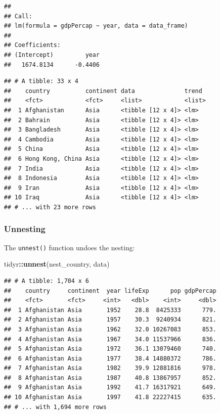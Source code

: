 \documentclass[12pt,]{article}
\newenvironment{Shaded}{\begin{snugshade}}{\end{snugshade}}
\newcommand{\KeywordTok}[1]{\textcolor[rgb]{0.13,0.29,0.53}{\textbf{#1}}}
\newcommand{\StringTok}[1]{\textcolor[rgb]{0.31,0.60,0.02}{#1}}
\newcommand{\CommentTok}[1]{\textcolor[rgb]{0.56,0.35,0.01}{\textit{#1}}}
\newcommand{\OperatorTok}[1]{\textcolor[rgb]{0.81,0.36,0.00}{\textbf{#1}}}
\newcommand{\NormalTok}[1]{#1}
\begin{document}
\begin{verbatim}
## 
## Call:
## lm(formula = gdpPercap ~ year, data = data_frame)
## 
## Coefficients:
## (Intercept)         year  
##   1674.8134      -0.4406
\end{verbatim}

\begin{Shaded}
\end{Shaded}

\begin{verbatim}
## # A tibble: 33 x 4
##    country          continent data              trend 
##    <fct>            <fct>     <list>            <list>
##  1 Afghanistan      Asia      <tibble [12 x 4]> <lm>  
##  2 Bahrain          Asia      <tibble [12 x 4]> <lm>  
##  3 Bangladesh       Asia      <tibble [12 x 4]> <lm>  
##  4 Cambodia         Asia      <tibble [12 x 4]> <lm>  
##  5 China            Asia      <tibble [12 x 4]> <lm>  
##  6 Hong Kong, China Asia      <tibble [12 x 4]> <lm>  
##  7 India            Asia      <tibble [12 x 4]> <lm>  
##  8 Indonesia        Asia      <tibble [12 x 4]> <lm>  
##  9 Iran             Asia      <tibble [12 x 4]> <lm>  
## 10 Iraq             Asia      <tibble [12 x 4]> <lm>  
## # ... with 23 more rows
\end{verbatim}

\subsubsection{Unnesting}\label{unnesting}

The \texttt{unnest()} function undoes the nesting:

\begin{Shaded}
\begin{Highlighting}[]
\NormalTok{tidyr}\OperatorTok{::}\KeywordTok{unnest}\NormalTok{(nest_country, data)}
\end{Highlighting}
\end{Shaded}

\begin{verbatim}
## # A tibble: 1,704 x 6
##    country     continent  year lifeExp      pop gdpPercap
##    <fct>       <fct>     <int>   <dbl>    <int>     <dbl>
##  1 Afghanistan Asia       1952    28.8  8425333      779.
##  2 Afghanistan Asia       1957    30.3  9240934      821.
##  3 Afghanistan Asia       1962    32.0 10267083      853.
##  4 Afghanistan Asia       1967    34.0 11537966      836.
##  5 Afghanistan Asia       1972    36.1 13079460      740.
##  6 Afghanistan Asia       1977    38.4 14880372      786.
##  7 Afghanistan Asia       1982    39.9 12881816      978.
##  8 Afghanistan Asia       1987    40.8 13867957      852.
##  9 Afghanistan Asia       1992    41.7 16317921      649.
## 10 Afghanistan Asia       1997    41.8 22227415      635.
## # ... with 1,694 more rows
\end{verbatim}
\end{document}

